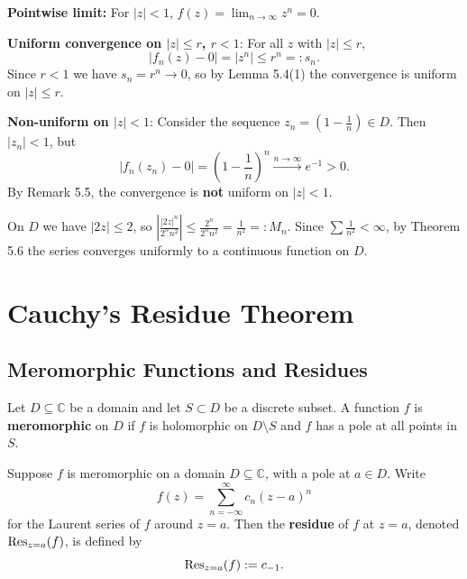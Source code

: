 \documentclass[11pt, a4paper]{article}
\begin{document}
\begin{exbox}[Show $f_n(z)=z^n$ converges uniformly on $|z|\leq r$ for $r<1$, but not on $|z|<1$]
\textbf{Pointwise limit:} For $|z|<1$, $f(z)=\lim_{n\to\infty}z^n=0$.

\textbf{Uniform convergence on $|z|\leq r$, $r<1$}: For all $z$ with $|z|\leq r$,
\[
  |f_n(z)-0| = |z^n| \leq r^n =: s_n.
\]
Since $r<1$ we have $s_n=r^n\to 0$, so by Lemma 5.4(1) the convergence is uniform on $|z|\leq r$.

\textbf{Non-uniform on $|z|<1$}: Consider the sequence $z_n = \left(1-\frac{1}{n}\right)\in D$. Then $|z_n|<1$, but
\[
  |f_n(z_n)-0| = \left(1-\frac{1}{n}\right)^n \xrightarrow{n\to\infty} e^{-1} > 0.
\]
By Remark 5.5, the convergence is \textbf{not} uniform on $|z|<1$.
\end{exbox}

\begin{exbox}[M-Test: $\sum_{n=1}^{\infty}\frac{|2z|^n}{2^n n^2}$ converges uniformly on $D$]
On $D$ we have $|2z|\leq 2$, so $\left|\frac{|2z|^n}{2^n n^2}\right|\leq\frac{2^n}{2^n n^2}=\frac{1}{n^2}=:M_n$. Since $\sum\frac{1}{n^2}<\infty$, by Theorem 5.6 the series converges uniformly to a continuous function on $D$.
\end{exbox}

\newpage
\section{Cauchy's Residue Theorem}

\subsection*{Meromorphic Functions and Residues}

\begin{defbox}
Let $D\subseteq\mathbb{C}$ be a domain and let $S\subset D$ be a discrete subset. A function $f$ is \textbf{meromorphic} on $D$ if $f$ is holomorphic on $D\setminus S$ and $f$ has a pole at all points in $S$.
\end{defbox}

\begin{defbox}
Suppose $f$ is meromorphic on a domain $D\subseteq\mathbb{C}$, with a pole at $a\in D$. Write
\[
  f(z) = \sum_{n=-\infty}^{\infty} c_n(z-a)^n
\]
for the Laurent series of $f$ around $z=a$. Then the \textbf{residue} of $f$ at $z=a$, denoted $\operatorname{Res}_{z=a}(f)$, is defined by
\[
  \operatorname{Res}_{z=a}(f) := c_{-1}.
\]
\end{defbox}
\end{document}
